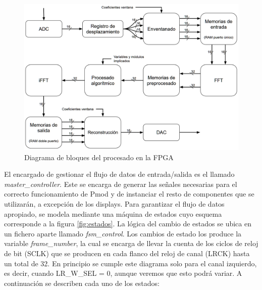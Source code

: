\begin{figure}[!ht]
\begin{center}
\includegraphics[width=15cm]{img/diagramabloques.png}
\caption{\label{fig:dbloques}Diagrama de bloques del procesado en la FPGA}
\end{center}
\end{figure}

El encargado de gestionar el flujo de datos de entrada/salida es el llamado \emph{master\_controller}. Este se encarga de generar las señales necesarias para el correcto funcionamiento de Pmod y de instanciar el resto de componentes que se utilizarán, a excepción de los displays. Para garantizar el flujo de datos apropiado, se modela mediante una máquina de estados cuyo esquema corresponde a la figura \ref{fig:estados}. La lógica del cambio de estados se ubica en un fichero aparte llamado \emph{fsm\_control}. Los cambios de estado los produce la variable \emph{frame\_number}, la cual se encarga de llevar la cuenta de los ciclos de reloj de bit (SCLK) que se producen en cada flanco del reloj de canal (LRCK) hasta un total de 32. En principio se cumple este diagrama solo para el canal izquierdo, es decir, cuando LR\_W\_SEL = 0, aunque veremos que esto podrá variar. A continuación se describen cada uno de los estados: 

